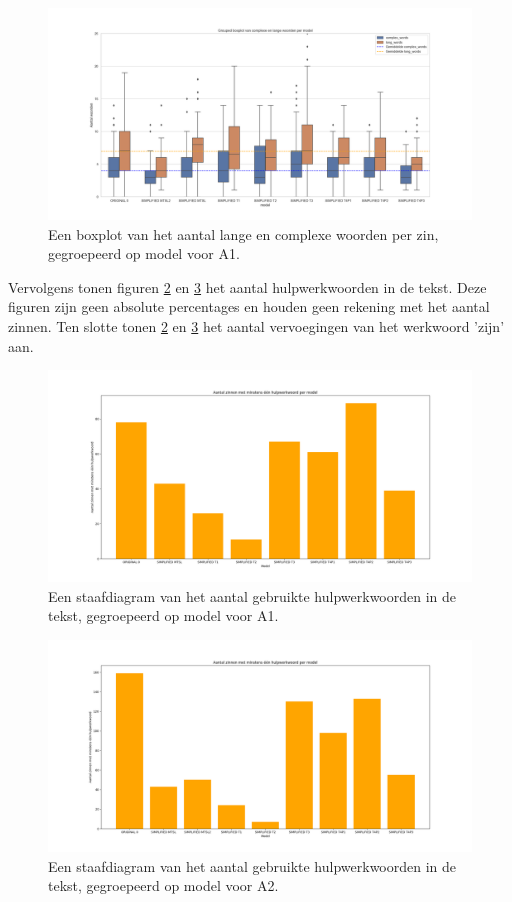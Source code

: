 \begin{figure}[H]
	\includegraphics[width=\linewidth]{img/boxplot-poster.png}
	\caption{Een boxplot van het aantal lange en complexe woorden per zin, gegroepeerd op model voor A1.}
	\label{img:long-complex-words}
\end{figure}


Vervolgens tonen figuren \ref{img:histplot-aux-a1} en \ref{img:histplot-aux-a2} het aantal hulpwerkwoorden in de tekst. Deze figuren zijn geen absolute percentages en houden geen rekening met het aantal zinnen. Ten slotte tonen \ref{img:histplot-aux-a1} en \ref{img:histplot-aux-a2} het aantal vervoegingen van het werkwoord 'zijn' aan. 

\begin{figure}[H]
	\includegraphics[width=\linewidth]{img/boxplot-aux-a1.png}
	\caption{Een staafdiagram van het aantal gebruikte hulpwerkwoorden in de tekst, gegroepeerd op model voor A1.}
	\label{img:histplot-aux-a1}
\end{figure}

\begin{figure}[H]
	\includegraphics[width=\linewidth]{img/boxplot-aux-a2.png}
	\caption{Een staafdiagram van het aantal gebruikte hulpwerkwoorden in de tekst, gegroepeerd op model voor A2.}
	\label{img:histplot-aux-a2}
\end{figure}

